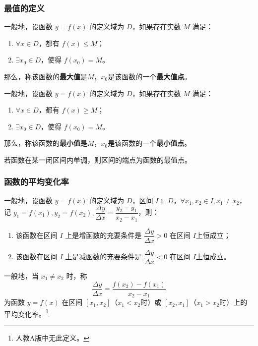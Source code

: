 \documentclass[a4paper,openany]{ctexbook}
\begin{document}
\subsubsection{最值的定义}

一般地，设函数 \(y=f(x)\) 的定义域为 \(D\)，如果存在实数 \(M\) 满足：
\begin{enumerate}
    \item \(\forall x \in D\)，都有 \(f(x)\le M\)；
    \item \(\exists x_0 \in D\)，使得 \(f(x_0)=M\)。
\end{enumerate}

那么，称该函数的\textbf{最大值}是\(M\)，\(x_0\)是该函数的一个\textbf{最大值点}。

一般地，设函数 \(y=f(x)\) 的定义域为 \(D\)，如果存在实数 \(M\) 满足：
\begin{enumerate}
    \item \(\forall x \in D\)，都有 \(f(x)\ge M\)；
    \item \(\exists x_0 \in D\)，使得 \(f(x_0)=M\)。
\end{enumerate}

那么，称该函数的\textbf{最小值}是\(M\)，\(x_0\)是该函数的一个\textbf{最小值点}。

若函数在某一闭区间内单调，则区间的端点为函数的最值点。

\subsubsection{函数的平均变化率}

一般地，设函数 \(y=f(x)\) 的定义域为 \(D\)，区间 \(I \subseteq D\)，\(\forall x_1,x_2 \in I,x_1 \ne x_2\)，
记 \(y_1=f(x_1),y_2=f(x_2),\dfrac{\Delta y}{\Delta x}=\dfrac{y_2-y_1}{x_2-x_1}\)，则：
\begin{enumerate}
    \item 该函数在区间 \(I\) 上是增函数的充要条件是 \(\dfrac{\Delta y}{\Delta x}>0\) 在区间 \(I\)上恒成立；
    \item 该函数在区间 \(I\) 上是减函数的充要条件是 \(\dfrac{\Delta y}{\Delta x}<0\) 在区间 \(I\)上恒成立。
\end{enumerate}

一般地，当 \(x_1 \ne x_2\) 时，称
\[
    \dfrac{\Delta y}{\Delta x}=\dfrac{f(x_2)-f(x_1)}{x_2-x_1}
\]
为函数 \(y=f(x)\) 在区间 \([x_1,x_2]\)（\(x_1<x_2\)时）或 \([x_2,x_1]\)（\(x_1>x_2\)时）上的平均变化率。\footnote{人教A版中无此定义。}
\end{document}

